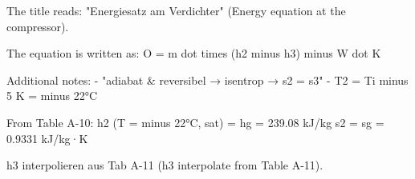 The title reads: "Energiesatz am Verdichter" (Energy equation at the compressor).  

The equation is written as:  
O = m dot times (h2 minus h3) minus W dot K  

Additional notes:  
- "adiabat & reversibel → isentrop → s2 = s3"  
- T2 = Ti minus 5 K = minus 22°C  

From Table A-10:  
h2 (T = minus 22°C, sat) = hg = 239.08 kJ/kg  
s2 = sg = 0.9331 kJ/kg·K  

h3 interpolieren aus Tab A-11 (h3 interpolate from Table A-11).